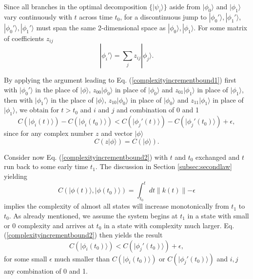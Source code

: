 \documentclass[12pt,amsmath,amssymb,onecolumn]{revtex4-2}
\begin{document}
Since all branches in the optimal decomposition $\{ |\psi_i \rangle \}$
aside from $|\phi_0 \rangle $ and $|\phi_1 \rangle $
vary continuously with $t$ across time $t_0$,
for a discontinuous jump to $|\phi_0' \rangle , |\phi_1' \rangle $, 
$|\phi_0' \rangle , |\phi_1' \rangle $ must span the same
2-dimensional space as $|\phi_0 \rangle , |\phi_1 \rangle $.
For some matrix of coefficients $z_{ij}$
\begin{equation}
  \label{phirotation}
  |\phi_i' \rangle  = \sum_j z_{ij} |\phi_j \rangle .
\end{equation}

By applying the argument leading to Eq. (\ref{complexityincrementbound1})
first with $|\phi_0' \rangle $ in the place of $|\phi \rangle $,
$z_{00} |\phi_0 \rangle $ in place of $|\phi_0 \rangle $ and 
$z_{01} |\phi_1 \rangle $ in place of $|\phi_1 \rangle $,
then with $|\phi_1' \rangle $ in the place of $|\phi \rangle $,
$z_{10} |\phi_0 \rangle $ in place of $|\phi_0 \rangle $ and 
$z_{11} |\phi_1 \rangle $ in place of $|\phi_1 \rangle $,
we obtain for $t > t_0$ and $i$ and $j$
and combination of 0 and 1
\begin{equation}
  \label{complexityincrementbound2}
  C( |\phi_i(t) \rangle ) - C(|\phi_i(t_0) \rangle ) < 
  C( |\phi_j'(t) \rangle ) - C(|\phi_j'(t_0) \rangle ) + \epsilon,
\end{equation}
since for any complex number $z$ and vector $|\phi \rangle $
\begin{equation}
  \label{scaleinv}
  C( z|\phi \rangle ) = C( |\phi \rangle ).
\end{equation}

Consider now Eq. (\ref{complexityincrementbound2}) with
$t$ and $t_0$ exchanged and $t$ run back to some early time
$t_1$.  The
discussion in Section \ref{subsec:secondlaw}
yielding
\begin{equation}
  \label{complexityincrement2x}
  C( |\phi(t) \rangle , |\phi(t_0) \rangle ) = \int_{t_0}^t dt \parallel k(t) \parallel - \epsilon
\end{equation}
implies the complexity of almost all states will
increase monotonically from $t_1$ to $t_0$.
As already mentioned, we assume the system
begins at $t_1$ in a state with small or 0 complexity
and arrives at $t_0$ in a state with complexity
much larger.  Eq. (\ref{complexityincrementbound2})
then yields the result
\begin{equation}
  \label{complexityincrementbound3}
  C(|\phi_i(t_0) \rangle ) < C(|\phi_j'(t_0) \rangle ) + \epsilon,
\end{equation}
for some small $\epsilon$ much smaller than
$C(|\phi_i(t_0) \rangle )$ or $C(|\phi_j'(t_0) \rangle )$
and $i, j$  any combination of 0 and 1.
\end{document}
